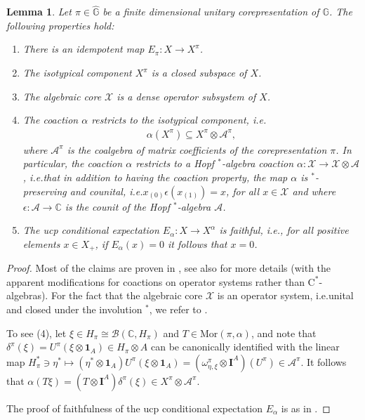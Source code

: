 \documentclass{amsart}
\theoremstyle{plain}
\newtheorem{lemma}[theorem]{Lemma}
\theoremstyle{definition}
\theoremstyle{remark}
\begin{document}
	\begin{lemma}\label{lem:Properties-isotypical-components}
		Let $\pi \in \widehat{\mathbb{G}}$ be a finite dimensional unitary corepresentation of $\mathbb{G}$.
		The following properties hold:
		\begin{enumerate}
			\item There is an idempotent map $E_\pi : X \rightarrow X^\pi$.
			\item The isotypical component $X^\pi$ is a closed subspace of $X$.
			\item The algebraic core $\mathcal{X}$ is a dense operator subsystem of $X$.
			\item The coaction $\alpha$ restricts to the isotypical component, i.e.
			\begin{align}
				\alpha(X^\pi) \subseteq X^\pi \otimes \mathcal{A}^\pi,
			\end{align}
			where $\mathcal{A}^\pi$ is the coalgebra of matrix coefficients of the corepresentation $\pi$.
			In particular, the coaction $\alpha$ restricts to a Hopf $^*$-algebra coaction $\alpha : \mathcal{X} \rightarrow \mathcal{X} \otimes \mathcal{A}$, i.e.\@ that in addition to having the \emph{coaction property}, the map $\alpha$ is \emph{$^*$-preserving} and \emph{counital}, i.e.\@ $x_{(0)}\epsilon(x_{(1)}) = x$, for all $x \in \mathcal{X}$ and where $\epsilon : \mathcal{A} \rightarrow \mathbb{C}$ is the counit of the Hopf $^*$-algebra $\mathcal{A}$.
			\item The ucp conditional expectation $E_\alpha : X \rightarrow X^\alpha$ is faithful, i.e., for all positive elements $x \in X_+$, if $E_\alpha(x) = 0$ it follows that $x = 0$. 
		\end{enumerate}
	\end{lemma}
	
	\begin{proof}
		Most of the claims are proven in \cite[Proposition 3.4]{dRH24}, see also \cite[Section 3]{DC16} for more details (with the apparent modifications for coactions on operator systems rather than $\mathrm{C}^*$-algebras).
		For the fact that the algebraic core $\mathcal{X}$ is an operator system, i.e.\@ unital and closed under the involution $^*$, we refer to \cite[Theorem 3.16]{DC16}. 
		
		To see (4), let $\xi \in H_\pi \cong \mathcal{B}(\mathbb{C},H_\pi)$ and $T \in \mathrm{Mor}(\pi,\alpha)$, and note that $\delta^\pi(\xi) = U^\pi(\xi \otimes \mathbf{1}_A) \in H_\pi \otimes A$ can be canonically identified with the linear map $H_\pi^* \ni \eta^* \mapsto (\eta^* \otimes \mathbf{1}_A) U^\pi (\xi \otimes \mathbf{1}_A) = (\omega^\pi_{\eta,\xi} \otimes \mathbf{I}^A) (U^\pi) \in \mathcal{A}^\pi$.
		It follows that $\alpha (T\xi) = (T \otimes \mathbf{I}^A) \delta^\pi(\xi) \in X^\pi \otimes \mathcal{A}^\pi$.
		
		The proof of faithfulness of the ucp conditional expectation $E_\alpha$ is as in \cite[Lemma 3.19]{DC16}.
	\end{proof}
	
\end{document}
